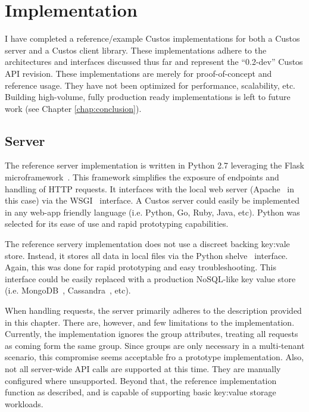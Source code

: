 \section{Implementation}

I have completed a reference/example Custos implementations for both a
Custos server and a Custos client library. These implementations
adhere to the architectures and interfaces discussed thus far and
represent the ``0.2-dev'' Custos API revision. These implementations
are merely for proof-of-concept and reference usage. They have not
been optimized for performance, scalability, etc. Building
high-volume, fully production ready implementations is left to future
work (see Chapter \ref{chap:conclusion}).

\subsection{Server}

The reference server implementation is written in Python 2.7
leveraging the Flask microframework~\cite{python-flask}. This
framework simplifies the exposure of endpoints and handling of HTTP
requests. It interfaces with the local web server
(Apache~\cite{apache} in this case) via the WSGI~\cite{pep-wsgi}
interface. A Custos server could easily be implemented in any web-app
friendly language (i.e. Python, Go, Ruby, Java, etc). Python was
selected for its ease of use and rapid prototyping capabilities.

The reference servery implementation does not use a discreet backing
key:vale store. Instead, it stores all data in local files via the
Python shelve~\cite{python-shelve} interface. Again, this was done for
rapid prototyping and easy troubleshooting. This interface could be
easily replaced with a production NoSQL-like key value store
(i.e. MongoDB~\cite{mongodb}, Cassandra~\cite{cassandra}, etc).

When handling requests, the server primarily adheres to the
description provided in this chapter. There are, however, and few
limitations to the implementation. Currently, the implementation
ignores the group attributes, treating all requests as coming form the
same group. Since groups are only necessary in a multi-tenant
scenario, this compromise seems acceptable fro a prototype
implementation. Also, not all server-wide API calls are supported at
this time. They are manually configured where unsupported. Beyond
that, the reference implementation function as described, and is
capable of supporting basic key:value storage workloads.

